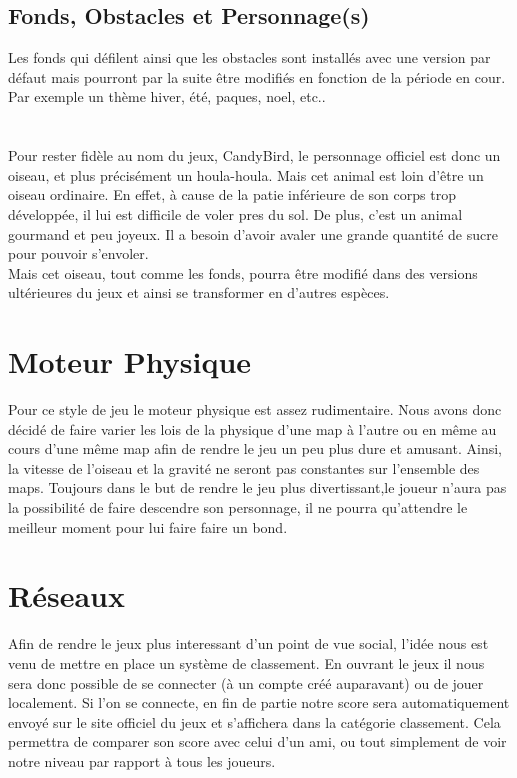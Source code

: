 \documentclass [11pt]{report}
\begin{document}
		\subsection {Fonds, Obstacles et Personnage(s)}
 		Les fonds qui défilent ainsi que les obstacles sont installés avec une version par défaut mais pourront par la suite être modifiés en fonction de la période en cour. Par exemple un thème hiver, été, paques, noel, etc..\\\\\\
 \indent Pour rester fidèle au nom du jeux, CandyBird, le personnage officiel est donc un oiseau, et plus précisément un houla-houla.
 		Mais cet animal est loin d'être un oiseau ordinaire. En effet, à cause de la patie inférieure de son corps trop développée, il lui est difficile de voler pres du sol. De plus, c'est un animal gourmand et peu joyeux. Il a besoin d'avoir avaler une grande quantité de sucre pour pouvoir s'envoler.\\
Mais cet oiseau, tout comme les fonds, pourra être modifié dans des versions ultérieures du jeux et ainsi se transformer en d'autres espèces.\\\vspace{5mm}



	\section {Moteur Physique}
	Pour ce style de jeu le moteur physique est assez rudimentaire. Nous avons donc décidé de faire varier les lois de la physique d'une map à l'autre ou en même au cours d'une même map afin de rendre le jeu un peu plus dure et amusant. Ainsi, la vitesse de l'oiseau et la gravité ne seront pas constantes sur l'ensemble des maps. Toujours dans le but de rendre le jeu plus divertissant,le joueur n'aura pas la possibilité de faire descendre son personnage, il ne pourra qu'attendre le meilleur moment pour lui faire faire un bond.\\\vspace{5mm}



	\section {Réseaux}
	Afin de rendre le jeux plus interessant d'un point de vue social, l'idée nous est venu de mettre en place un système de classement. En ouvrant le jeux il nous sera donc possible de se connecter (à un compte créé auparavant) ou de jouer localement. Si l'on se connecte, en fin de partie notre score sera automatiquement envoyé sur le site officiel du jeux et s'affichera dans la catégorie classement. Cela permettra de comparer son score avec celui d'un ami, ou tout simplement de voir notre niveau par rapport à tous les joueurs.\\\vspace{5mm}
\end{document}
